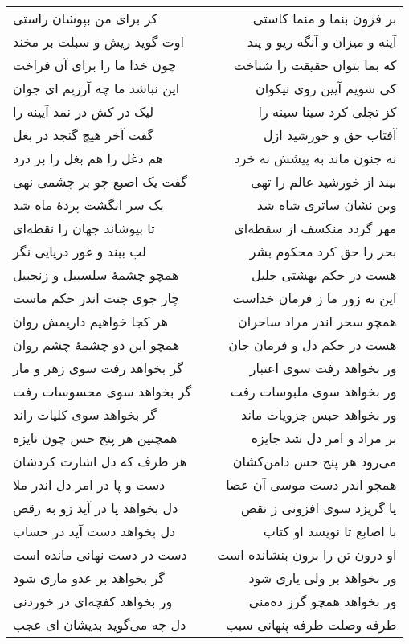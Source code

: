 \begin{center}
\begin{longtable}{l p{0.5cm} r}
کز برای من بپوشان راستی
&&
بر فزون بنما و منما کاستی
\\
اوت گوید ریش و سبلت بر مخند
&&
آینه و میزان و آنگه ریو و پند
\\
چون خدا ما را برای آن فراخت
&&
که بما بتوان حقیقت را شناخت
\\
این نباشد ما چه آرزیم ای جوان
&&
کی شویم آیین روی نیکوان
\\
لیک در کش در نمد آیینه را
&&
کز تجلی کرد سینا سینه را
\\
گفت آخر هیچ گنجد در بغل
&&
آفتاب حق و خورشید ازل
\\
هم دغل را هم بغل را بر درد
&&
نه جنون ماند به پیشش نه خرد
\\
گفت یک اصبع چو بر چشمی نهی
&&
بیند از خورشید عالم را تهی
\\
یک سر انگشت پردهٔ ماه شد
&&
وین نشان ساتری شاه شد
\\
تا بپوشاند جهان را نقطه‌ای
&&
مهر گردد منکسف از سقطه‌ای
\\
لب ببند و غور دریایی نگر
&&
بحر را حق کرد محکوم بشر
\\
همچو چشمهٔ سلسبیل و زنجبیل
&&
هست در حکم بهشتی جلیل
\\
چار جوی جنت اندر حکم ماست
&&
این نه زور ما ز فرمان خداست
\\
هر کجا خواهیم داریمش روان
&&
همچو سحر اندر مراد ساحران
\\
همچو این دو چشمهٔ چشم روان
&&
هست در حکم دل و فرمان جان
\\
گر بخواهد رفت سوی زهر و مار
&&
ور بخواهد رفت سوی اعتبار
\\
گر بخواهد سوی محسوسات رفت
&&
ور بخواهد سوی ملبوسات رفت
\\
گر بخواهد سوی کلیات راند
&&
ور بخواهد حبس جزویات ماند
\\
همچنین هر پنج حس چون نایزه
&&
بر مراد و امر دل شد جایزه
\\
هر طرف که دل اشارت کردشان
&&
می‌رود هر پنج حس دامن‌کشان
\\
دست و پا در امر دل اندر ملا
&&
همچو اندر دست موسی آن عصا
\\
دل بخواهد پا در آید زو به رقص
&&
یا گریزد سوی افزونی ز نقص
\\
دل بخواهد دست آید در حساب
&&
با اصابع تا نویسد او کتاب
\\
دست در دست نهانی مانده است
&&
او درون تن را برون بنشانده است
\\
گر بخواهد بر عدو ماری شود
&&
ور بخواهد بر ولی یاری شود
\\
ور بخواهد کفچه‌ای در خوردنی
&&
ور بخواهد همچو گرز ده‌منی
\\
دل چه می‌گوید بدیشان ای عجب
&&
طرفه وصلت طرفه پنهانی سبب

\end{longtable}
\end{center}
